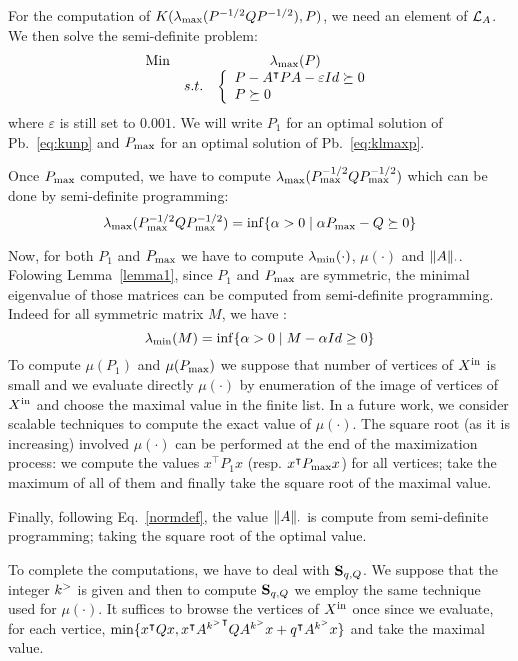\documentclass[10pt]{article}
\begin{document}
For the computation of $K(\lambda_{\operatorname{max}}(P^{-1/2}QP^{-1/2}),P)$, we need an element of $\mathcal{L}_{A}$. We then solve the semi-definite problem:
\begin{equation}
\label{eq:klmaxp}
\begin{array}{llc}
\operatorname*{Min} & &\lambda_{\operatorname{max}}(P)\\
 & s. t. &\left\{\begin{array}{l} 
         P-A^\intercal P A-\varepsilon Id\succeq 0\\
         P\succeq  0
        \end{array}\right.
\end{array}
\end{equation}
where $\varepsilon$ is still set to $0.001$.
We will write $P_1$ for an optimal solution of Pb.~\eqref{eq:kunp} and $P_{\mathrm{max}}$ for an optimal solution of Pb.~\eqref{eq:klmaxp}. 

Once $P_{\mathrm{max}}$ computed, we have to compute $\lambda_{\operatorname{max}}(P_{\mathrm{max}}^{-1/2}Q P_{\mathrm{max}}^{-1/2})$ which can be done by semi-definite programming:
\[
\lambda_{\operatorname{max}}(P_{\mathrm{max}}^{-1/2}Q P_{\mathrm{max}}^{-1/2})=\inf\{\alpha>0\mid \alpha P_{\mathrm{max}}-Q\succeq 0\}
\] 

Now, for both $P_1$ and $P_{\mathrm{max}}$ we have to compute $\lambda_{\operatorname{min}}(\cdot)$, $\mu(\cdot)$ and $\| A\|_{\cdot}$. Folowing Lemma~\ref{lemma1}, since $P_1$ and $P_{\mathrm{max}}$ are symmetric, the minimal eigenvalue
of those matrices can be computed from semi-definite programming. Indeed for all symmetric matrix $M$, we have : 
\[
\lambda_{\operatorname{min}}(M)=\inf\{\alpha>0\mid M-\alpha Id\geq 0\}
\] 
To compute $\mu(P_1)$ and $\mu(P_{\mathrm{max}})$ we suppose that number of vertices of $X^\mathrm{in}$ is small and we evaluate directly $\mu(\cdot)$ by enumeration of the image of vertices of $X^\mathrm{in}$ and choose the maximal value in the finite list. In a future work, we consider scalable techniques to compute the exact value of $\mu(\cdot)$. The square root (as it is increasing) involved $\mu(\cdot)$ can be performed at the end of the maximization process: we compute the values $x^\intercal P_1 x$ (resp. $x^\intercal P_{\mathrm{max}} x$) for all vertices; take the maximum of all of them and finally take the square root of the maximal value. 

Finally, following Eq.~\eqref{normdef}, the value $\| A\|_\cdot$ is compute from semi-definite programming; taking the square root of the optimal value.

To complete the computations, we have to deal with $\mathbf{S}_{q,Q}$. We suppose that the integer $k^{>}$ is given and then to compute $\mathbf{S}_{q,Q}$ we employ the same technique used for $\mu(\cdot)$. It suffices to browse the vertices of $X^\mathrm{in}$ once since we evaluate, for each vertice, $\min\{x^\intercal Q x, x^\intercal {A^{k^{>}}}^\intercal Q {A^{k^{>}}}x+q^\intercal A^{k^{>}} x\}$ and take the maximal value. 
\end{document}
